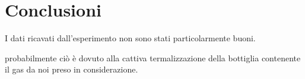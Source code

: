 \section{Conclusioni}

I dati ricavati dall'esperimento non sono stati particolarmente buoni.

probabilmente ciò è dovuto alla cattiva termalizzazione della bottiglia contenente il gas da noi preso in considerazione.
